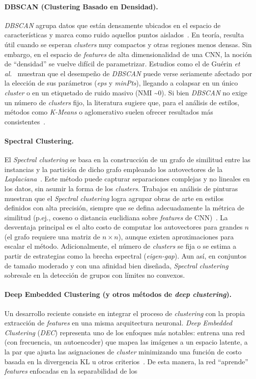 \paragraph{DBSCAN (Clustering Basado en Densidad).} \textit{DBSCAN} agrupa datos que están densamente ubicados en el espacio de características y marca como ruido aquellos puntos aislados~\cite{guerin2018}. En teoría, resulta útil cuando se esperan \textit{clusters} muy compactos y otras regiones menos densas. Sin embargo, en el espacio de \textit{features} de alta dimensionalidad de una CNN, la noción de “densidad” se vuelve difícil de parametrizar. Estudios como el de Guérin \textit{et al.}~\cite{guerin2018} muestran que el desempeño de \textit{DBSCAN} puede verse seriamente afectado por la elección de sus parámetros (\textit{eps} y \textit{minPts}), llegando a colapsar en un único \textit{cluster} o en un etiquetado de ruido masivo (NMI \textasciitilde 0). Si bien \textit{DBSCAN} no exige un número de \textit{clusters} fijo, la literatura sugiere que, para el análisis de estilos, métodos como \textit{K-Means} o aglomerativo suelen ofrecer resultados más consistentes~\cite{dangeti2024}. \paragraph{Spectral Clustering.} El \textit{Spectral clustering} se basa en la construcción de un grafo de similitud entre las instancias y la partición de dicho grafo empleando los autovectores de la \textit{Laplaciana}~\cite{guerin2018,gultepe2018}. Este método puede capturar separaciones complejas y no lineales en los datos, sin asumir la forma de los \textit{clusters}. Trabajos en análisis de pinturas muestran que el \textit{Spectral clustering} logra agrupar obras de arte en estilos definidos con alta precisión, siempre que se defina adecuadamente la métrica de similitud (p.ej., coseno o distancia euclidiana sobre \textit{features} de CNN)~\cite{gultepe2018}. La desventaja principal es el alto costo de computar los autovectores para grandes $n$ (el grafo requiere una matriz de $n \times n$), aunque existen aproximaciones para escalar el método. Adicionalmente, el número de \textit{clusters} se fija o se estima a partir de estrategias como la brecha espectral (\textit{eigen-gap}). Aun así, en conjuntos de tamaño moderado y con una afinidad bien diseñada, \textit{Spectral clustering} sobresale en la detección de grupos con límites no convexos. \paragraph{Deep Embedded Clustering (y otros métodos de \textit{deep clustering}).} Un desarrollo reciente consiste en integrar el proceso de \textit{clustering} con la propia extracción de \textit{features} en una misma arquitectura neuronal. \textit{Deep Embedded Clustering} (\textit{DEC}) representa uno de los enfoques más notables: entrena una red (con frecuencia, un autoencoder) que mapea las imágenes a un espacio latente, a la par que ajusta las asignaciones de \textit{cluster} minimizando una función de costo basada en la divergencia KL u otros criterios~\cite{dangeti2024}. De esta manera, la red “aprende” \textit{features} enfocadas en la separabilidad de los 